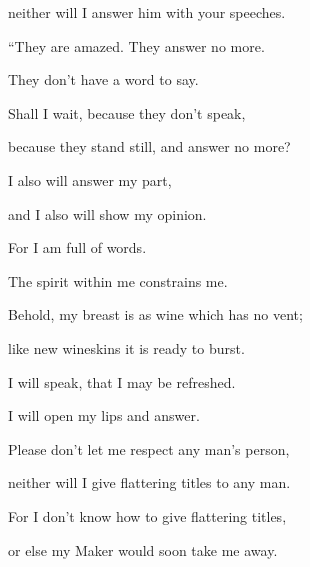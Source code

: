 {\par }{\QB neither will I answer him with your speeches.
\par }{\BB \par }{\Q {}“They are amazed. They answer no more.
\par }{\QB They don’t have a word to say.
\par }{\Q {}Shall I wait, because they don’t speak,
\par }{\QB because they stand still, and answer no more?
\par }{\Q {}I also will answer my part,
\par }{\QB and I also will show my opinion.
\par }{\Q {}For I am full of words.
\par }{\QB The spirit within me constrains me.
\par }{\Q {}Behold, my breast is as wine which has no vent;
\par }{\QB like new wineskins it is ready to burst.
\par }{\Q {}I will speak, that I may be refreshed.
\par }{\QB I will open my lips and answer.
\par }{\Q {}Please don’t let me respect any man’s person,
\par }{\QB neither will I give flattering titles to any man.
\par }{\Q {}For I don’t know how to give flattering titles,
\par }{\QB or else my Maker would soon take me away.
\par }{\BB \par }
